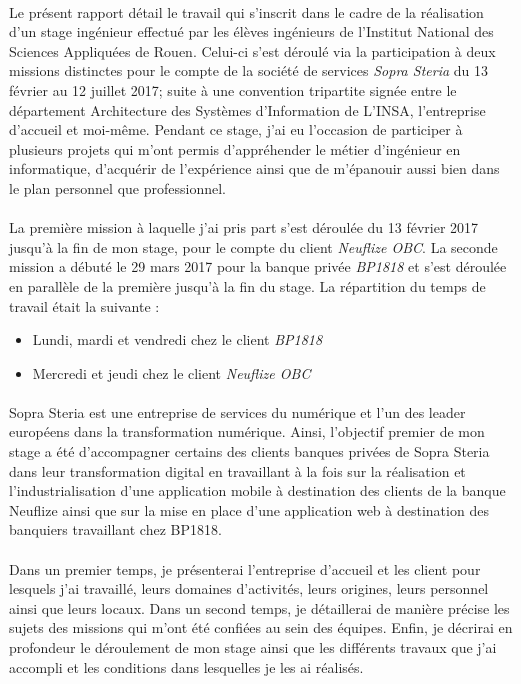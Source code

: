 \paragraph{}
Le présent rapport détail le travail qui s’inscrit dans le cadre de la réalisation d’un stage ingénieur effectué par les élèves ingénieurs de l’Institut National des Sciences Appliquées de Rouen. Celui-ci s’est déroulé via la participation à deux missions distinctes pour le compte de la société de services \textit{Sopra Steria} du 13 février au 12 juillet 2017; suite à une convention tripartite signée entre le département Architecture des Systèmes d’Information de L’INSA, l’entreprise d’accueil et moi-même. Pendant ce stage, j’ai eu l’occasion de participer à plusieurs projets qui m’ont permis d’appréhender le métier d’ingénieur en informatique, d’acquérir de l’expérience ainsi que de m’épanouir aussi bien dans le plan personnel que professionnel.

\paragraph{}
La première mission à laquelle j'ai pris part s'est déroulée du 13 février 2017 jusqu'à la fin de mon stage, pour le compte du client \textit{Neuflize OBC}. La seconde mission a débuté le 29 mars 2017 pour la banque privée \textit{BP1818} et s'est déroulée en parallèle de la première jusqu'à la fin du stage. La répartition du temps de travail était la suivante :
\begin{itemize}
	\item Lundi, mardi et vendredi chez le client \textit{BP1818}
	\item Mercredi et jeudi chez le client \textit{Neuflize OBC}
\end{itemize}

\paragraph{}
Sopra Steria est une entreprise de services du numérique et l'un des leader européens dans la transformation numérique. Ainsi, l'objectif premier de mon stage a été d'accompagner certains des clients banques privées de Sopra Steria dans leur transformation digital en travaillant à la fois sur la réalisation et l'industrialisation d'une application mobile à destination des clients de la banque Neuflize ainsi que sur la mise en place d'une application web à destination des banquiers travaillant chez BP1818.

\paragraph{}
Dans un premier temps, je présenterai l'entreprise d'accueil et les client pour lesquels j'ai travaillé, leurs domaines d’activités, leurs origines, leurs personnel ainsi que leurs locaux.
Dans un second temps, je détaillerai de manière précise les sujets des missions qui m’ont été confiées au sein des équipes.
Enfin, je décrirai en profondeur le déroulement de mon stage ainsi que les différents travaux que j’ai accompli et les conditions dans lesquelles je les ai réalisés. 

